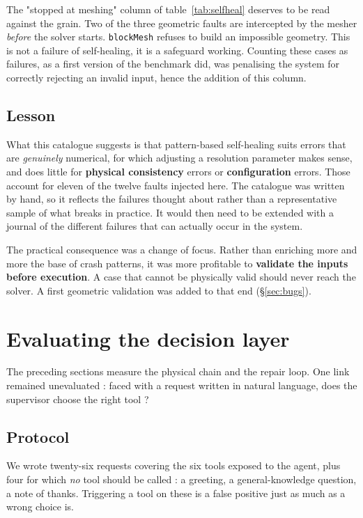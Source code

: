 \documentclass[12pt,a4paper]{report}
\begin{document}
The "stopped at meshing" column of table~\ref{tab:selfheal} deserves to be
read against the grain. Two of the three geometric faults are intercepted by the
mesher \emph{before} the solver starts. \texttt{blockMesh} refuses to build an
impossible geometry. This is not a failure of self-healing, it is a safeguard working. Counting these cases as failures, as a first version of the
benchmark did, was penalising the system for correctly rejecting an
invalid input, hence the addition of this column.

\subsection{Lesson}

What this catalogue suggests is that pattern-based self-healing suits errors
that are \emph{genuinely} numerical, for which adjusting a resolution parameter
makes sense, and does little for \textbf{physical consistency} errors or
\textbf{configuration} errors. Those account for eleven of the twelve faults
injected here. The catalogue was written by hand, so it reflects the failures
thought about rather than a representative sample of what breaks in
practice. It would then need to be extended with a journal of the different failures that can actually occur in the system.

The practical consequence was a change of focus. Rather than enriching more and more
the base of crash patterns, it was more profitable to \textbf{validate the inputs
before execution}. A case that cannot be physically valid should never reach the
solver. A first geometric validation was added to that end (§\ref{sec:bugs}).
\section{Evaluating the decision layer}
\label{sec:toolselection}

The preceding sections measure the physical chain and the repair loop. One link
remained unevaluated : faced with a request written in natural
language, does the supervisor choose the right tool ?

\subsection{Protocol}

We wrote twenty-six requests covering the six tools exposed to the agent, plus
four for which \emph{no} tool should be called : a greeting, a general-knowledge
question, a note of thanks. Triggering a tool on these is a
false positive just as much as a wrong choice is.
\end{document}
